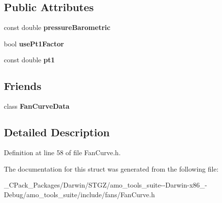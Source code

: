 \subsection*{Public Attributes}
\begin{DoxyCompactItemize}
\item 
\mbox{\label{struct_fan_curve_data_1_1_base_operating_point_ab66cd337152255bf82b7ef98f828144b}} 
const double {\bfseries pressure\+Barometric}
\item 
\mbox{\label{struct_fan_curve_data_1_1_base_operating_point_a4d09155765f22458b9feb10d77a188de}} 
bool {\bfseries use\+Pt1\+Factor}
\item 
\mbox{\label{struct_fan_curve_data_1_1_base_operating_point_ab349de155902de5f1a2c6dc6f48191b3}} 
const double {\bfseries pt1}
\end{DoxyCompactItemize}
\subsection*{Friends}
\begin{DoxyCompactItemize}
\item 
\mbox{\label{struct_fan_curve_data_1_1_base_operating_point_a6c0df668730aa3a6673d279f2bbe7799}} 
class {\bfseries Fan\+Curve\+Data}
\end{DoxyCompactItemize}


\subsection{Detailed Description}


Definition at line 58 of file Fan\+Curve.\+h.



The documentation for this struct was generated from the following file\+:\begin{DoxyCompactItemize}
\item 
\+\_\+\+C\+Pack\+\_\+\+Packages/\+Darwin/\+S\+T\+G\+Z/amo\+\_\+tools\+\_\+suite-\/-\/\+Darwin-\/x86\+\_-\/\+Debug/amo\+\_\+tools\+\_\+suite/include/fans/Fan\+Curve.\+h\end{DoxyCompactItemize}
